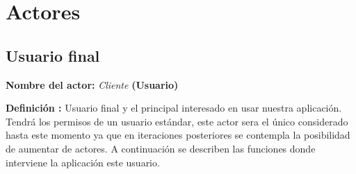 \section{Actores}

\subsection{Usuario final}
\textbf{Nombre del actor:} \textit{Cliente} \textbf{(Usuario)}\par
\textbf{Definición :} Usuario final y el principal interesado en usar nuestra aplicación. Tendrá los permisos de un usuario estándar, este actor sera el único considerado hasta este momento ya que en iteraciones posteriores se contempla la posibilidad de aumentar de actores. A continuación se describen las funciones donde interviene la aplicación este usuario.